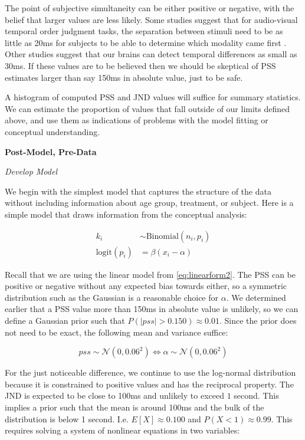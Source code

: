 \documentclass[11pt, oneside, openany]{scrbook}
\begin{document}
The point of subjective simultaneity can be either positive or negative, with the belief that larger values are less likely. Some studies suggest that for audio-visual temporal order judgment tasks, the separation between stimuli need to be as little as 20ms for subjects to be able to determine which modality came first \citep{vatakis2007influence}. Other studies suggest that our brains can detect temporal differences as small as 30ms. If these values are to be believed then we should be skeptical of PSS estimates larger than say 150ms in absolute value, just to be safe.

A histogram of computed PSS and JND values will suffice for summary statistics. We can estimate the proportion of values that fall outside of our limits defined above, and use them as indications of problems with the model fitting or conceptual understanding.

\textbf{Post-Model, Pre-Data}

\emph{Develop Model}

We begin with the simplest model that captures the structure of the data without including information about age group, treatment, or subject. Here is a simple model that draws information from the conceptual analysis:


\begin{align*}
  k_i &\sim \mathrm{Binomial}(n_i, p_i) \\
  \mathrm{logit}(p_i) &= \beta ( x_i - \alpha )
\end{align*}

Recall that we are using the linear model from \eqref{eq:linearform2}. The PSS can be positive or negative without any expected bias towards either, so a symmetric distribution such as the Gaussian is a reasonable choice for \(\alpha\). We determined earlier that a PSS value more than 150ms in absolute value is unlikely, so we can define a Gaussian prior such that \(P(|pss| > 0.150) \approx 0.01\). Since the prior does not need to be exact, the following mean and variance suffice:

\[
pss \sim \mathcal{N}(0, 0.06^2) \Longleftrightarrow \alpha \sim \mathcal{N}(0, 0.06^2)
\]

For the just noticeable difference, we continue to use the log-normal distribution because it is constrained to positive values and has the reciprocal property. The JND is expected to be close to 100ms and unlikely to exceed \(1\) second. This implies a prior such that the mean is around 100ms and the bulk of the distribution is below 1 second. I.e. \(E[X] \approx 0.100\) and \(P(X < 1) \approx 0.99\). This requires solving a system of nonlinear equations in two variables:
\end{document}
